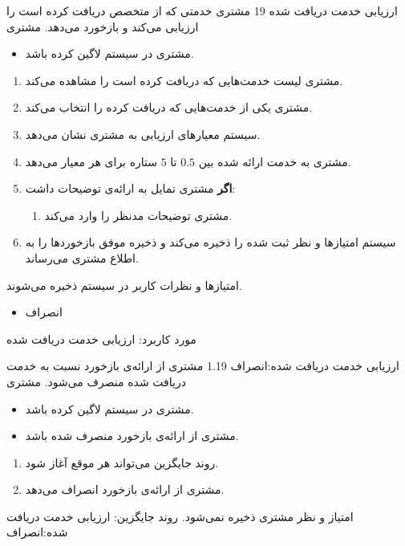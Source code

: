 {
\usecase
{
	ارزیابی خدمت دریافت شده
}
{19}
{
	مشتری خدمتی که از متخصص دریافت کرده است را ارزیابی می‌کند و بازخورد می‌دهد.
}
{
	مشتری
}
{}
{
		\begin{itemize}
		\vspace*{-0.6cm}
		\item 
		مشتری در سیستم لاگین کرده باشد.
	\end{itemize}
}
{
	\vspace*{-0.6cm}
	\begin{enumerate}
		\item 
		مشتری لیست خدمت‌‌هایی که دریافت کرده است را مشاهده می‌کند.
		\item
		مشتری یکی از خدمت‌هایی که دریافت کرده را انتخاب می‌کند.

		\item
سیستم معیارهای ارزیابی  به مشتری نشان می‌دهد.
		\item 
مشتری به خدمت ارائه شده بین $0.5$ تا $5$ ستاره برای هر معیار می‌دهد.

			\item 
	\textbf{اگر} مشتری تمایل به ارائه‌ی توضیحات داشت:
				\begin{enumerate}[label=\theenumi.\arabic*.]
		\item 
		مشتری توضیحات مدنظر را وارد می‌کند. 
	\end{enumerate}
		\item
		سیستم امتیازها و نظر ثبت شده را ذخیره می‌کند و ذخیره موفق بازخوردها را به اطلاع مشتری می‌رساند.
		
	\end{enumerate}
}
{
امتیازها و نظرات کاربر در سیستم ذخیره می‌شوند.
}
{
	\begin{itemize}
		\vspace*{-0.6cm}
		\item 
		انصراف
	\end{itemize}
}
{
	مورد کاربرد: ارزیابی خدمت دریافت شده
}





\alternativeflow
{
ارزیابی خدمت دریافت شده:انصراف
}
{1.19}
{
مشتری از ارائه‌ی بازخورد نسبت به خدمت دریافت شده منصرف می‌شود.
}
{
	مشتری
}
{}
{
	\begin{itemize}
		\vspace*{-0.6cm}
		\item 
		مشتری در سیستم لاگین کرده باشد.
		\item
		مشتری از ارائه‌ی بازخورد منصرف شده باشد.
	\end{itemize}
}
{
	\vspace*{-0.6cm}
	\begin{enumerate}
		\item 
		روند جایگزین می‌تواند هر موقع آغاز شود.
		\item
		مشتری از ارائه‌ی بازخورد انصراف می‌دهد.
	\end{enumerate}
}
{
امتیاز و نظر مشتری ذخیره نمی‌شود.
}
{
روند جایگزین: ارزیابی خدمت دریافت شده:انصراف
}


}

